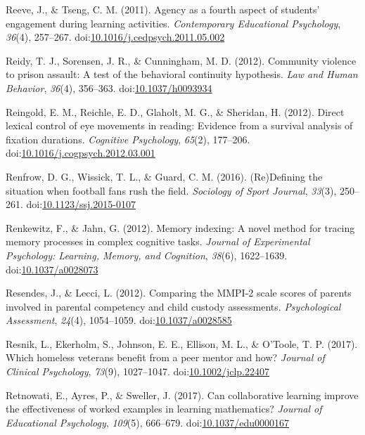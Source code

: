 \documentclass[english,man]{apa6}
\begin{document}
\hypertarget{ref-Reeve2011}{}
Reeve, J., \& Tseng, C. M. (2011). Agency as a fourth aspect of
students' engagement during learning activities. \emph{Contemporary
Educational Psychology}, \emph{36}(4), 257--267.
doi:\href{https://doi.org/10.1016/j.cedpsych.2011.05.002}{10.1016/j.cedpsych.2011.05.002}

\hypertarget{ref-Reidy2012}{}
Reidy, T. J., Sorensen, J. R., \& Cunningham, M. D. (2012). Community
violence to prison assault: A test of the behavioral continuity
hypothesis. \emph{Law and Human Behavior}, \emph{36}(4), 356--363.
doi:\href{https://doi.org/10.1037/h0093934}{10.1037/h0093934}

\hypertarget{ref-Reingold2012}{}
Reingold, E. M., Reichle, E. D., Glaholt, M. G., \& Sheridan, H. (2012).
Direct lexical control of eye movements in reading: Evidence from a
survival analysis of fixation durations. \emph{Cognitive Psychology},
\emph{65}(2), 177--206.
doi:\href{https://doi.org/10.1016/j.cogpsych.2012.03.001}{10.1016/j.cogpsych.2012.03.001}

\hypertarget{ref-Renfrow2016}{}
Renfrow, D. G., Wissick, T. L., \& Guard, C. M. (2016). (Re)Defining the
situation when football fans rush the field. \emph{Sociology of Sport
Journal}, \emph{33}(3), 250--261.
doi:\href{https://doi.org/10.1123/ssj.2015-0107}{10.1123/ssj.2015-0107}

\hypertarget{ref-Renkewitz2012}{}
Renkewitz, F., \& Jahn, G. (2012). Memory indexing: A novel method for
tracing memory processes in complex cognitive tasks. \emph{Journal of
Experimental Psychology: Learning, Memory, and Cognition}, \emph{38}(6),
1622--1639.
doi:\href{https://doi.org/10.1037/a0028073}{10.1037/a0028073}

\hypertarget{ref-Resendes2012}{}
Resendes, J., \& Lecci, L. (2012). Comparing the MMPI-2 scale scores of
parents involved in parental competency and child custody assessments.
\emph{Psychological Assessment}, \emph{24}(4), 1054--1059.
doi:\href{https://doi.org/10.1037/a0028585}{10.1037/a0028585}

\hypertarget{ref-Resnik2017}{}
Resnik, L., Ekerholm, S., Johnson, E. E., Ellison, M. L., \& O'Toole, T.
P. (2017). Which homeless veterans benefit from a peer mentor and how?
\emph{Journal of Clinical Psychology}, \emph{73}(9), 1027--1047.
doi:\href{https://doi.org/10.1002/jclp.22407}{10.1002/jclp.22407}

\hypertarget{ref-Retnowati2017}{}
Retnowati, E., Ayres, P., \& Sweller, J. (2017). Can collaborative
learning improve the effectiveness of worked examples in learning
mathematics? \emph{Journal of Educational Psychology}, \emph{109}(5),
666--679.
doi:\href{https://doi.org/10.1037/edu0000167}{10.1037/edu0000167}
\end{document}
